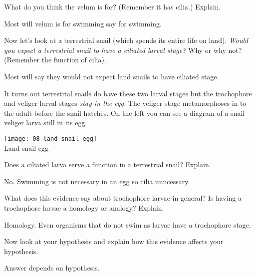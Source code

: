 \documentclass[12pt, hidelinks]{exam}
\newcommand*\AnswerBox[2]{%
    \parbox[t][#1]{0.92\textwidth}{%
    \begin{solution}#2\end{solution}}
    \vspace{\stretch{1}}
}
\begin{document}
\begin{questions}
\question[2]
What do you think the velum is for? (Remember it has cilia.) Explain.

\AnswerBox{4\baselineskip}{Most will velum is for swimming say for swimming.}


\question
Now let's look at a terrestrial snail (which spends its
entire life on land). \emph{Would you expect a terrestrial snail to
have a ciliated larval stage?} Why or why not? (Remember the
function of cilia).

\AnswerBox{4\baselineskip}{Most will say they would not expect land snails to have ciliated stage.}

\begin{minipage}{0.75\textwidth}%
It turns out terrestrial snails do have these two larval stages but the
trochophore and veliger larval stages \emph{stay in the egg.} The veliger stage
metamorphoses in to the adult before the snail hatches. On the left you
can see a diagram of a snail veliger larva still in its egg.
\end{minipage}\hfill
\begin{minipage}{0.25\textwidth}%
\centering\texttt{[image: 08\_land\_snail\_egg]}\\
{\footnotesize Land snail egg}
\end{minipage}

\question[2]
Does a ciliated larva serve a function in a terrestrial snail? Explain.

\AnswerBox{4\baselineskip}{No. Swimming is not necessary in an egg so cilia unncessary.}

\question[2]
What does this evidence say about trochophore larvae in
general? Is having a trochophore larvae a homology or analogy? Explain.

\AnswerBox{4\baselineskip}{Homology. Even organisms that do not swim as larvae have a trochophore stage. }


\question[2]
Now look at your hypothesis and explain how this evidence
affects your hypothesis. 

\AnswerBox{4\baselineskip}{Answer depends on hypothesis. }

\end{questions}
\end{document}
